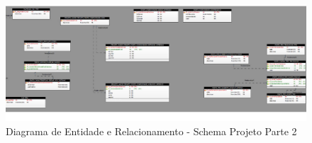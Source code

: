 \documentclass{acm_proc_article-sp}
\begin{document}
\begin{appendices}
\begin{figure}[h]
\centering %
\includegraphics[width=1\textwidth]{DER_projeto_p2.jpg} %
\caption{Diagrama de Entidade e Relacionamento - Schema Projeto Parte 2}
\end{figure}



\end{appendices}
\end{document}
